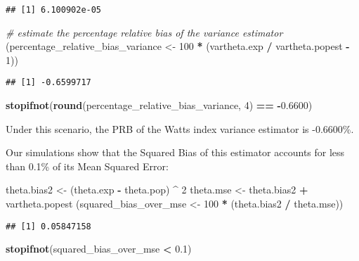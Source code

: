 \documentclass[
]{book}
\newenvironment{Shaded}{\begin{snugshade}}{\end{snugshade}}
\newcommand{\CommentTok}[1]{\textcolor[rgb]{0.56,0.35,0.01}{\textit{#1}}}
\newcommand{\DecValTok}[1]{\textcolor[rgb]{0.00,0.00,0.81}{#1}}
\newcommand{\FloatTok}[1]{\textcolor[rgb]{0.00,0.00,0.81}{#1}}
\newcommand{\FunctionTok}[1]{\textcolor[rgb]{0.13,0.29,0.53}{\textbf{#1}}}
\newcommand{\NormalTok}[1]{#1}
\newcommand{\OtherTok}[1]{\textcolor[rgb]{0.56,0.35,0.01}{#1}}
\newcommand{\SpecialCharTok}[1]{\textcolor[rgb]{0.81,0.36,0.00}{\textbf{#1}}}
\begin{document}
\begin{verbatim}
## [1] 6.100902e-05
\end{verbatim}

\begin{Shaded}
\begin{Highlighting}[]
\CommentTok{\# estimate the percentage relative bias of the variance estimator}
\NormalTok{(percentage\_relative\_bias\_variance }\OtherTok{\textless{}{-}} \DecValTok{100} \SpecialCharTok{*}\NormalTok{  (vartheta.exp }\SpecialCharTok{/}\NormalTok{ vartheta.popest }\SpecialCharTok{{-}} \DecValTok{1}\NormalTok{))}
\end{Highlighting}
\end{Shaded}

\begin{verbatim}
## [1] -0.6599717
\end{verbatim}

\begin{Shaded}
\begin{Highlighting}[]
\FunctionTok{stopifnot}\NormalTok{(}\FunctionTok{round}\NormalTok{(percentage\_relative\_bias\_variance, }\DecValTok{4}\NormalTok{) }\SpecialCharTok{==} \SpecialCharTok{{-}}\FloatTok{0.6600}\NormalTok{)}
\end{Highlighting}
\end{Shaded}

Under this scenario, the PRB of the Watts index variance estimator is -0.6600\%.

Our simulations show that the Squared Bias of this estimator accounts for less than 0.1\% of its Mean Squared Error:

\begin{Shaded}
\begin{Highlighting}[]
\NormalTok{theta.bias2 }\OtherTok{\textless{}{-}}\NormalTok{ (theta.exp }\SpecialCharTok{{-}}\NormalTok{ theta.pop) }\SpecialCharTok{\^{}} \DecValTok{2}
\NormalTok{theta.mse }\OtherTok{\textless{}{-}}\NormalTok{ theta.bias2 }\SpecialCharTok{+}\NormalTok{ vartheta.popest}
\NormalTok{(squared\_bias\_over\_mse }\OtherTok{\textless{}{-}} \DecValTok{100} \SpecialCharTok{*}\NormalTok{ (theta.bias2 }\SpecialCharTok{/}\NormalTok{ theta.mse))}
\end{Highlighting}
\end{Shaded}

\begin{verbatim}
## [1] 0.05847158
\end{verbatim}

\begin{Shaded}
\begin{Highlighting}[]
\FunctionTok{stopifnot}\NormalTok{(squared\_bias\_over\_mse }\SpecialCharTok{\textless{}} \FloatTok{0.1}\NormalTok{)}
\end{Highlighting}
\end{Shaded}
\end{document}
